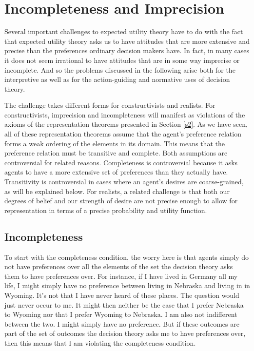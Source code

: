 \section{Incompleteness and Imprecision} \label{s4}

Several important challenges to expected utility theory have to do with the fact that expected utility theory asks us to have attitudes that are more extensive and precise than the preferences ordinary decision makers have. In fact, in many cases it does not seem irrational to have attitudes that are in some way imprecise or incomplete. And so the problems discussed in the following arise both for the interpretive as well as for the action-guiding and normative uses of decision theory.

The challenge takes different forms for constructivists and realists. For constructivists, imprecision and incompleteness will manifest as violations of the axioms of the representation theorems presented in Section \ref{s2}. As we have seen, all of these representation theorems assume that the agent's preference relation forms a weak ordering of the elements in its domain. This means that the preference relation must be transitive and complete. Both assumptions are controversial for related reasons. Completeness is controversial because it asks agents to have a more extensive set of preferences than they actually have. Transitivity is controversial in cases where an agent's desires are coarse-grained, as will be explained below. For realists, a related challenge is that both our degrees of belief and our strength of desire are not precise enough to allow for representation in terms of a precise probability and utility function.

\subsection{Incompleteness}\label{subs41}

To start with the completeness condition, the worry here is that agents simply do not have preferences over all the elements of the set the decision theory asks them to have preferences over. For instance, if I have lived in Germany all my life, I might simply have no preference between living in Nebraska and living in in Wyoming. It's not that I have never heard of these places. The question would just never occur to me. It might then neither be the case that I prefer Nebraska to Wyoming nor that I prefer Wyoming to Nebraska. I am also not indifferent between the two. I might simply have no preference. But if these outcomes are part of the set of outcomes the decision theory asks me to have preferences over, then this means that I am violating the completeness condition.

